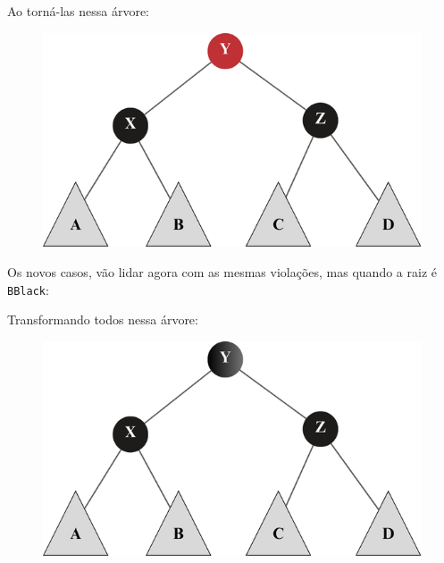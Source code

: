 Ao torná-las nessa árvore:

\begin{figure}[!ht]
	\centering
	\includegraphics[scale=0.5]{figures/rubro-negra/left-left-solution.png}
\end{figure}
\FloatBarrier

Os novos casos, vão lidar agora com as mesmas violações, mas quando a raiz é \texttt{BBlack}:

\begin{figure}[!ht]
	\centering
\end{figure}
\FloatBarrier

Transformando todos nessa árvore:

\begin{figure}[!ht]
	\centering
	\includegraphics[scale=0.5]{figures/rubro-negra/balance-removal-solution.png}
\end{figure}
\FloatBarrier

